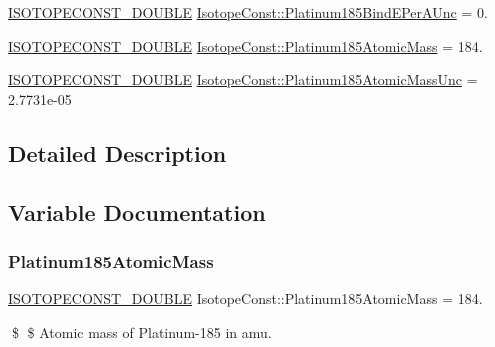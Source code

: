 \begin{DoxyCompactItemize}
\mbox{\hyperlink{group___isotope_const-_macros_ga8f45a7272ce02c0b4c65c44636ed719a}{I\+S\+O\+T\+O\+P\+E\+C\+O\+N\+S\+T\+\_\+\+D\+O\+U\+B\+LE}} \mbox{\hyperlink{group___isotope_const-_platinum-_pt185_gaf7517850857b6ea02f43344f17518d44}{Isotope\+Const\+::\+Platinum185\+Bind\+E\+Per\+A\+Unc}} = 0.
\item 
\mbox{\hyperlink{group___isotope_const-_macros_ga8f45a7272ce02c0b4c65c44636ed719a}{I\+S\+O\+T\+O\+P\+E\+C\+O\+N\+S\+T\+\_\+\+D\+O\+U\+B\+LE}} \mbox{\hyperlink{group___isotope_const-_platinum-_pt185_ga885686fb290b5d107ee0583624c1c3cd}{Isotope\+Const\+::\+Platinum185\+Atomic\+Mass}} = 184.
\item 
\mbox{\hyperlink{group___isotope_const-_macros_ga8f45a7272ce02c0b4c65c44636ed719a}{I\+S\+O\+T\+O\+P\+E\+C\+O\+N\+S\+T\+\_\+\+D\+O\+U\+B\+LE}} \mbox{\hyperlink{group___isotope_const-_platinum-_pt185_ga689b0eedb97817f3423338dc3876fe75}{Isotope\+Const\+::\+Platinum185\+Atomic\+Mass\+Unc}} = 2.\+7731e-\/05
\end{DoxyCompactItemize}


\subsection{Detailed Description}


\subsection{Variable Documentation}
\mbox{\label{group___isotope_const-_platinum-_pt185_ga885686fb290b5d107ee0583624c1c3cd}} 
\subsubsection{\texorpdfstring{Platinum185\+Atomic\+Mass}{Platinum185AtomicMass}}
{\footnotesize\ttfamily \mbox{\hyperlink{group___isotope_const-_macros_ga8f45a7272ce02c0b4c65c44636ed719a}{I\+S\+O\+T\+O\+P\+E\+C\+O\+N\+S\+T\+\_\+\+D\+O\+U\+B\+LE}} Isotope\+Const\+::\+Platinum185\+Atomic\+Mass = 184.}

\$ \$ Atomic mass of Platinum-\/185 in amu. \mbox{\label{group___isotope_const-_platinum-_pt185_ga689b0eedb97817f3423338dc3876fe75}} 
